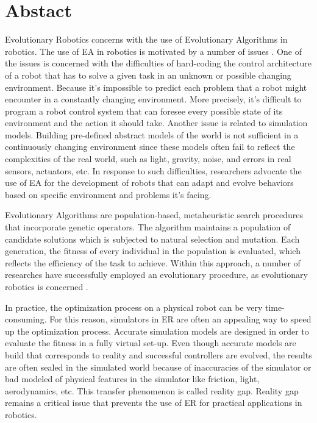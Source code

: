 \cleardoublepage %
\chapter*{Abstact}

\thispagestyle{empty}
\vspace{1cm}

Evolutionary Robotics concerns with the use of Evolutionary Algorithms in robotics. The use of EA in robotics is motivated by a number of issues \citet{meyer1998evolutionary} \citet{grefenstette1994evolutionary}. One of the issues is concerned with the difficulties of hard-coding the control architecture of a robot that has to solve a given task in an unknown or possible changing environment. Because it's impossible to predict each problem that a robot might encounter in a constantly changing environment. More precisely, it's difficult to program a robot control system that can foresee every possible state of its environment and the action it should take.  Another issue is related to simulation models. Building pre-defined abstract models of the world is not sufficient in a continuously changing environment since these models often fail to reflect the complexities of the real world, such as light, gravity, noise, and errors in real sensors, actuators, etc.  In response to such difficulties, researchers advocate the use of EA for the development of robots that can adapt and evolve behaviors based on specific environment and problems it's facing.

Evolutionary Algorithms are population-based, metaheuristic search procedures that incorporate genetic operators. The algorithm maintains a population of candidate solutions which is subjected to natural selection and mutation. Each generation, the fitness of every individual in the population is evaluated, which reflects the efficiency of the task to achieve. Within this approach, a number of researches have successfully employed an evolutionary procedure, as evolutionary robotics is concerned \citet{salomon1999evolving} \citet{faina2017automating}. 

In practice, the optimization process on a physical robot can be very time-consuming. For this reason, simulators in ER are often an appealing way to speed up the optimization process. Accurate simulation models are designed in order to evaluate the fitness in a fully virtual set-up. Even though accurate models are build that corresponds to reality and successful controllers are evolved, the results are often sealed in the simulated world because of inaccuracies of the simulator or bad modeled of physical features in the simulator like friction, light, aerodynamics, etc. This transfer phenomenon is called reality gap. Reality gap remains a critical issue that prevents the use of ER for practical applications in robotics.

